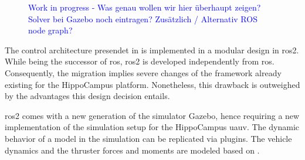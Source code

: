 \begin{figure}
\begin{tikzpicture}
		

	\end{tikzpicture}
	\caption{\textcolor{blue}{Work in progress - Was genau wollen wir hier überhaupt zeigen? Solver bei Gazebo noch eintragen? Zusätzlich / Alternativ ROS node graph?}}
	\label{fig:control_architecture}
\end{figure}




The control architecture presendet in  is implemented in a modular design in \ac{ros2}. While being the successor of \ac{ros}, \ac{ros2} is developed independently from \ac{ros}.
Consequently, the migration implies severe changes of the framework already existing for the HippoCampus platform. Nonetheless, this drawback is outweighed by the advantages this design decision entails. 

\ac{ros2} comes with a new generation of the simulator Gazebo, hence requiring a new implementation of the simulation setup for the HippoCampus \ac{uauv}. The dynamic behavior of a model in the simulation can be replicated via plugins. The vehicle dynamics and the thruster forces and moments are modeled based on  .

\label{sec:implementation}
